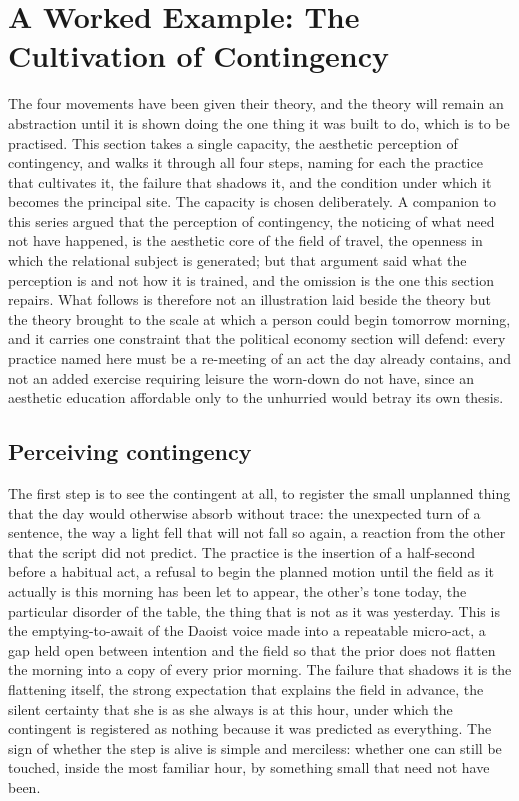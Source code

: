 \section{A Worked Example: The Cultivation of Contingency}
\label{p22:sec:worked-example}

\noindent
The four movements have been given their theory, and the theory will remain an abstraction until it is shown doing the one thing it was built to do, which is to be practised. This section takes a single capacity, the aesthetic perception of contingency, and walks it through all four steps, naming for each the practice that cultivates it, the failure that shadows it, and the condition under which it becomes the principal site. The capacity is chosen deliberately. A companion to this series argued that the perception of contingency, the noticing of what need not have happened, is the aesthetic core of the field of travel, the openness in which the relational subject is generated; but that argument said what the perception is and not how it is trained, and the omission is the one this section repairs. What follows is therefore not an illustration laid beside the theory but the theory brought to the scale at which a person could begin tomorrow morning, and it carries one constraint that the political economy section will defend: every practice named here must be a re-meeting of an act the day already contains, and not an added exercise requiring leisure the worn-down do not have, since an aesthetic education affordable only to the unhurried would betray its own thesis.

\subsection{Perceiving contingency}
\label{p22:sub:we-perceiving}

The first step is to see the contingent at all, to register the small unplanned thing that the day would otherwise absorb without trace: the unexpected turn of a sentence, the way a light fell that will not fall so again, a reaction from the other that the script did not predict. The practice is the insertion of a half-second before a habitual act, a refusal to begin the planned motion until the field as it actually is this morning has been let to appear, the other's tone today, the particular disorder of the table, the thing that is not as it was yesterday. This is the emptying-to-await of the Daoist voice made into a repeatable micro-act, a gap held open between intention and the field so that the prior does not flatten the morning into a copy of every prior morning. The failure that shadows it is the flattening itself, the strong expectation that explains the field in advance, the silent certainty that she is as she always is at this hour, under which the contingent is registered as nothing because it was predicted as everything. The sign of whether the step is alive is simple and merciless: whether one can still be touched, inside the most familiar hour, by something small that need not have been.

